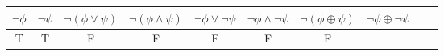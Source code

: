 \documentclass[oneside]{report}
\theoremstyle{definition}
\theoremstyle{definition}
\theoremstyle{definition}
\theoremstyle{remark}
\begin{document}
\begin{longtable}[]{@{}cccccccccc@{}}
\begin{minipage}[b]{0.04\columnwidth}
\(\lnot \phi\)\strut
\end{minipage} & \begin{minipage}[b]{0.04\columnwidth}\centering\strut
\(\lnot \psi\)\strut
\end{minipage} & \begin{minipage}[b]{0.08\columnwidth}\centering\strut
\(\lnot (\phi \lor \psi)\)\strut
\end{minipage} & \begin{minipage}[b]{0.08\columnwidth}\centering\strut
\(\lnot (\phi \land \psi)\)\strut
\end{minipage} & \begin{minipage}[b]{0.08\columnwidth}\centering\strut
\(\lnot \phi \lor \lnot \psi\)\strut
\end{minipage} & \begin{minipage}[b]{0.08\columnwidth}\centering\strut
\(\lnot \phi \land \lnot \psi\)\strut
\end{minipage} & \begin{minipage}[b]{0.09\columnwidth}\centering\strut
\(\lnot (\phi \oplus \psi)\)\strut
\end{minipage} & \begin{minipage}[b]{0.08\columnwidth}\centering\strut
\(\lnot \phi \oplus \lnot \psi\)\strut
\end{minipage}\tabularnewline
\midrule
\endhead
\begin{minipage}[t]{0.04\columnwidth}\centering\strut
T\strut
\end{minipage} & \begin{minipage}[t]{0.04\columnwidth}\centering\strut
T\strut
\end{minipage} & \begin{minipage}[t]{0.04\columnwidth}\centering\strut
F\strut
\end{minipage} & \begin{minipage}[t]{0.04\columnwidth}\centering\strut
F\strut
\end{minipage} & \begin{minipage}[t]{0.08\columnwidth}\centering\strut
F\strut
\end{minipage} & \begin{minipage}[t]{0.08\columnwidth}\centering\strut
F\strut
\end{minipage} & \begin{minipage}[t]{0.08\columnwidth}\centering\strut
F\strut
\end{minipage} & \begin{minipage}[t]{0.08\columnwidth}\centering\strut

\end{minipage}
\end{longtable}
\end{document}
